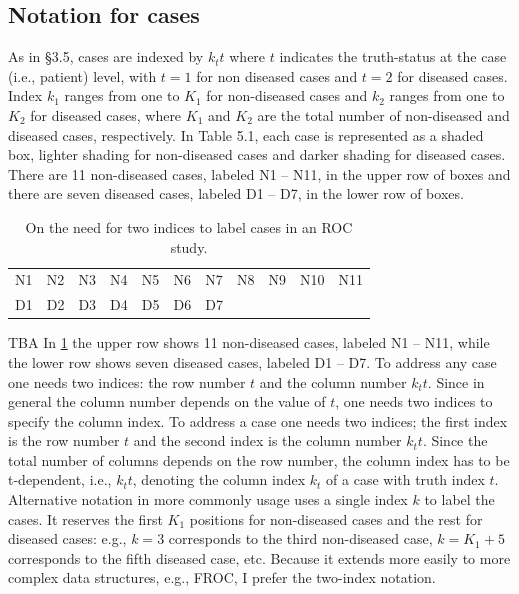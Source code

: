 \documentclass[
]{book}
\begin{document}
\hypertarget{notation-for-cases}{%
\subsection{Notation for cases}\label{notation-for-cases}}

As in §3.5, cases are indexed by \(k_tt\) where \(t\) indicates the truth-status at the case (i.e., patient) level, with \(t=1\) for non diseased cases and \(t=2\) for diseased cases. Index \(k_1\) ranges from one to \(K_1\) for non-diseased cases and \(k_2\) ranges from one to \(K_2\) for diseased cases, where \(K_1\) and \(K_2\) are the total number of non-diseased and diseased cases, respectively. In Table 5.1, each case is represented as a shaded box, lighter shading for non-diseased cases and darker shading for diseased cases. There are 11 non-diseased cases, labeled N1 -- N11, in the upper row of boxes and there are seven diseased cases, labeled D1 -- D7, in the lower row of boxes.

\begin{table}

\caption{\label{tab:empirical-ROC-2index-notation}On the need for two indices to label cases in an ROC study.}
\centering
\begin{tabular}[t]{l|l|l|l|l|l|l|l|l|l|l}
\hline
 &  &  &  &  &  &  &  &  &  & \\
\hline
N1 & N2 & N3 & N4 & N5 & N6 & N7 & N8 & N9 & N10 & N11\\
\hline
D1 & D2 & D3 & D4 & D5 & D6 & D7 &  &  &  & \\
\hline
\end{tabular}
\end{table}

TBA In \ref{tab:empirical-ROC-2index-notation} the upper row shows 11 non-diseased cases, labeled N1 -- N11, while the lower row shows seven diseased cases, labeled D1 -- D7. To address any case one needs two indices: the row number \(t\) and the column number \(k_tt\). Since in general the column number depends on the value of \(t\), one needs two indices to specify the column index. To address a case one needs two indices; the first index is the row number \(t\) and the second index is the column number \(k_tt\). Since the total number of columns depends on the row number, the column index has to be t-dependent, i.e., \(k_tt\), denoting the column index \(k_t\) of a case with truth index \(t\). Alternative notation in more commonly usage uses a single index \(k\) to label the cases. It reserves the first \(K_1\) positions for non-diseased cases and the rest for diseased cases: e.g., \(k = 3\) corresponds to the third non-diseased case, \(k = K_1+5\) corresponds to the fifth diseased case, etc. Because it extends more easily to more complex data structures, e.g., FROC, I prefer the two-index notation.
\end{document}
